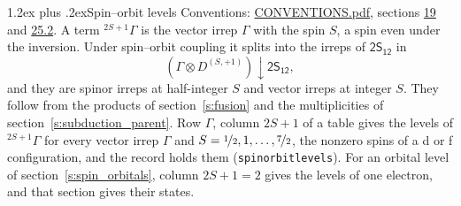\documentclass[10pt,a4paper]{article}
\makeatletter
\renewcommand\section{\@startsection{section}{1}{\z@}{-3ex plus -1ex minus -.2ex}%
  {1.2ex plus .2ex}{\normalfont\large\sffamily\bfseries\color{parttitle}}}
\numberwithin{equation}{section}
\newcommand{\grp}[1]{\mathsf{#1}}
\newcommand{\restr}[2]{#1\!\downarrow#2}
\newcommand{\irrJp}[2]{D^{(#1,#2)}}
\newcommand{\irrprod}{\otimes}
\newcommand{\term}[2]{{}^{#1}#2}
\makeatother
\begin{document}
\section{Spin--orbit levels}\label{s:spin_orbit}
Conventions: \href{../../CONVENTIONS.pdf}{CONVENTIONS.pdf}, sections \href{../../../rotation/CONVENTIONS.pdf\#conv.19}{19} and \href{../../CONVENTIONS.pdf\#conv.25.2}{25.2}.
\leavevmode\label{n:local.spin}\label{n:symbol.term}A term $\term{2S+1}{\Gamma}$ is the vector irrep $\Gamma$ with the spin $S$, a spin even under the inversion. Under spin--orbit coupling it splits into the irreps of $\grp{2S_{12}}$ in
\begin{equation}\label{e:spinorbit}\restr{(\Gamma \irrprod \irrJp{S}{+1})}{\grp{2S_{12}}},\end{equation}
and they are spinor irreps at half-integer $S$ and vector irreps at integer $S$. They follow from the products of section~\ref{s:fusion} and the multiplicities of section~\ref{s:subduction_parent}. Row $\Gamma$, column $2S + 1$ of a table gives the levels of $\term{2S+1}{\Gamma}$ for every vector irrep $\Gamma$ and $S = \nicefrac{1}{2}, 1, \dots, \nicefrac{7}{2}$, the nonzero spins of a d or f configuration, and the record holds them (\texttt{spinorbitlevels}). For an orbital level of section~\ref{s:spin_orbitals}, column $2S + 1 = 2$ gives the levels of one electron, and that section gives their states.
\end{document}
